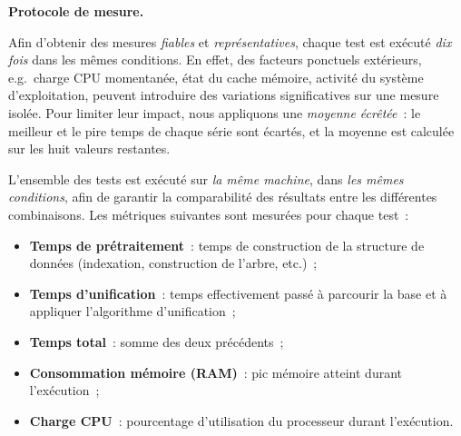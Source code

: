 \documentclass[11pt]{article}
\newenvironment{paraph}[1]{%
  \medskip
  \noindent\textbf{#1.}\quad

  \vspace{0.2cm}
}{%
  \medskip
}
\begin{document}
\begin{paraph}{Protocole de mesure}
    Afin d'obtenir des mesures \textit{fiables} et \textit{représentatives}, 
    chaque test est exécuté \textit{dix fois} dans les mêmes conditions. 
    En effet, des facteurs ponctuels extérieurs, e.g.~charge CPU momentanée, 
    état du cache mémoire, activité du système d'exploitation, peuvent 
    introduire des variations significatives sur une mesure isolée. Pour 
    limiter leur impact, nous appliquons une \textit{moyenne écrêtée}~: 
    le meilleur et le pire temps de chaque série sont écartés, et la 
    moyenne est calculée sur les huit valeurs restantes.

    \vspace{0.2cm}
    L'ensemble des tests est exécuté sur \textit{la même machine}, dans 
    \textit{les mêmes conditions}, afin de garantir la comparabilité 
    des résultats entre les différentes combinaisons. Les métriques 
    suivantes sont mesurées pour chaque test~:

    \begin{itemize}
        \item \textbf{Temps de prétraitement}~: temps de construction 
        de la structure de données (indexation, construction de l'arbre, 
        etc.)~;
        \item \textbf{Temps d'unification}~: temps effectivement passé 
        à parcourir la base et à appliquer l'algorithme d'unification~;
        \item \textbf{Temps total}~: somme des deux précédents~;
        \item \textbf{Consommation mémoire (RAM)}~: pic mémoire atteint 
        durant l'exécution~;
        \item \textbf{Charge CPU}~: pourcentage d'utilisation du 
        processeur durant l'exécution.
    \end{itemize}
\end{paraph}
\end{document}
